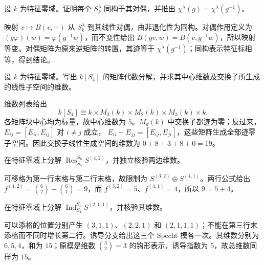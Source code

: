 \begin{exercise}\label{b5:ex:06-self-dual}
	设 \(k\) 为特征零域。证明每个 \(S_k^\lambda\) 同构于其对偶，并推出 \(\chi^\lambda(g)=\chi^\lambda(g^{-1})\)。
\end{exercise}
\begin{solution}
	映射 \(v\mapsto B(v,-)\) 从 \(S_k^\lambda\) 到其线性对偶，由非退化性为同构。对偶作用定义为 \((g\varphi)(w)=\varphi(g^{-1}w)\)，而不变性给出 \(B(gv,w)=B(v,g^{-1}w)\)，所以映射等变。对偶矩阵为原来逆矩阵的转置，其迹等于 \(\chi^\lambda(g^{-1})\)；同构表示特征标相等，得到结论。
\end{solution}

\begin{exercise}\label{b5:ex:06-s4-algebra}
	设 \(k\) 为特征零域。写出 \(k[S_4]\) 的矩阵代数分解，并求其中心维数及交换子所生成的线性子空间的维数。
\end{exercise}
\begin{solution}
	维数列表给出
	\[
		k[S_4]\cong k\times M_3(k)\times M_2(k)\times M_3(k)\times k.
	\]
	各矩阵块中心均为标量，故中心维数为 \(5\)。\(M_d(k)\) 中交换子都迹为零；反过来， \(E_{ij}=[E_{ii},E_{ij}]\) 对 \(i\ne j\) 成立， \(E_{ii}-E_{jj}=[E_{ij},E_{ji}]\)，这些矩阵生成全部迹零子空间。因此交换子线性生成空间的维数为 \(0+8+3+8+0=19\)。
\end{solution}

\begin{exercise}\label{b5:ex:06-restriction-42}
	在特征零域上分解 \(\operatorname{Res}_{S_5}^{S_6}S^{(4,2)}\)，并独立核验两边维数。
\end{exercise}
\begin{solution}
	可移格为第一行末格与第二行末格，故限制为 \(S^{(3,2)}\oplus S^{(4,1)}\)。两行公式给出 \(f^{(4,2)}=\binom62-\binom61=9\)，而 \(f^{(3,2)}=5\)、\(f^{(4,1)}=4\)，所以 \(9=5+4\)。
\end{solution}

\begin{exercise}\label{b5:ex:06-induction-211}
	在特征零域上分解 \(\operatorname{Ind}_{S_4}^{S_5}S^{(2,1,1)}\)，并核验其维数。
\end{exercise}
\begin{solution}
	可以添格的位置分别产生 \((3,1,1)\)、\((2,2,1)\) 和 \((2,1,1,1)\)；不能在第三行末添格而不同时增长第二行。诱导分支给出这三个 Specht 模各一次。其维数分别为 \(6,5,4\)，和为 \(15\)；原模是维数 \(\binom32=3\) 的钩形表示，诱导指数为 \(5\)，故总维数同样为 \(15\)。
\end{solution}

